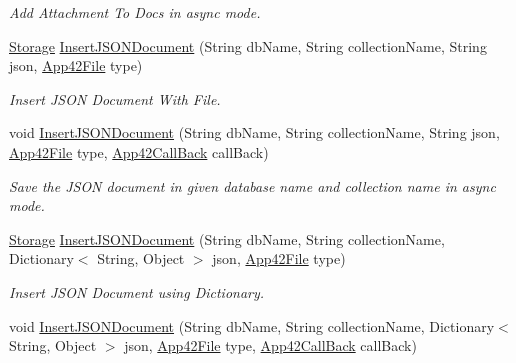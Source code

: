 \begin{DoxyCompactItemize}
\begin{DoxyCompactList}\small\item\em Add Attachment To Docs in async mode. \end{DoxyCompactList}\item 
\hyperlink{classcom_1_1shephertz_1_1app42_1_1paas_1_1sdk_1_1csharp_1_1storage_1_1_storage}{Storage} \hyperlink{classcom_1_1shephertz_1_1app42_1_1paas_1_1sdk_1_1csharp_1_1storage_1_1_storage_service_ac2fda97389e8b5627f9e6b90499fa046}{Insert\+J\+S\+O\+N\+Document} (String db\+Name, String collection\+Name, String json, \hyperlink{classcom_1_1shephertz_1_1app42_1_1paas_1_1sdk_1_1csharp_1_1_app42_file}{App42\+File} type)
\begin{DoxyCompactList}\small\item\em Insert J\+S\+O\+N Document With File. \end{DoxyCompactList}\item 
void \hyperlink{classcom_1_1shephertz_1_1app42_1_1paas_1_1sdk_1_1csharp_1_1storage_1_1_storage_service_a549d937e6dbc3624f819da5a81dc6512}{Insert\+J\+S\+O\+N\+Document} (String db\+Name, String collection\+Name, String json, \hyperlink{classcom_1_1shephertz_1_1app42_1_1paas_1_1sdk_1_1csharp_1_1_app42_file}{App42\+File} type, \hyperlink{interfacecom_1_1shephertz_1_1app42_1_1paas_1_1sdk_1_1csharp_1_1_app42_call_back}{App42\+Call\+Back} call\+Back)
\begin{DoxyCompactList}\small\item\em Save the J\+S\+O\+N document in given database name and collection name in async mode. \end{DoxyCompactList}\item 
\hyperlink{classcom_1_1shephertz_1_1app42_1_1paas_1_1sdk_1_1csharp_1_1storage_1_1_storage}{Storage} \hyperlink{classcom_1_1shephertz_1_1app42_1_1paas_1_1sdk_1_1csharp_1_1storage_1_1_storage_service_abf943257d88313e4269354ab9ee2a917}{Insert\+J\+S\+O\+N\+Document} (String db\+Name, String collection\+Name, Dictionary$<$ String, Object $>$ json, \hyperlink{classcom_1_1shephertz_1_1app42_1_1paas_1_1sdk_1_1csharp_1_1_app42_file}{App42\+File} type)
\begin{DoxyCompactList}\small\item\em Insert J\+S\+O\+N Document using Dictionary. \end{DoxyCompactList}\item 
void \hyperlink{classcom_1_1shephertz_1_1app42_1_1paas_1_1sdk_1_1csharp_1_1storage_1_1_storage_service_ab3fec0e29f060c78e6c50b56705fbf1b}{Insert\+J\+S\+O\+N\+Document} (String db\+Name, String collection\+Name, Dictionary$<$ String, Object $>$ json, \hyperlink{classcom_1_1shephertz_1_1app42_1_1paas_1_1sdk_1_1csharp_1_1_app42_file}{App42\+File} type, \hyperlink{interfacecom_1_1shephertz_1_1app42_1_1paas_1_1sdk_1_1csharp_1_1_app42_call_back}{App42\+Call\+Back} call\+Back)

\end{DoxyCompactItemize}
